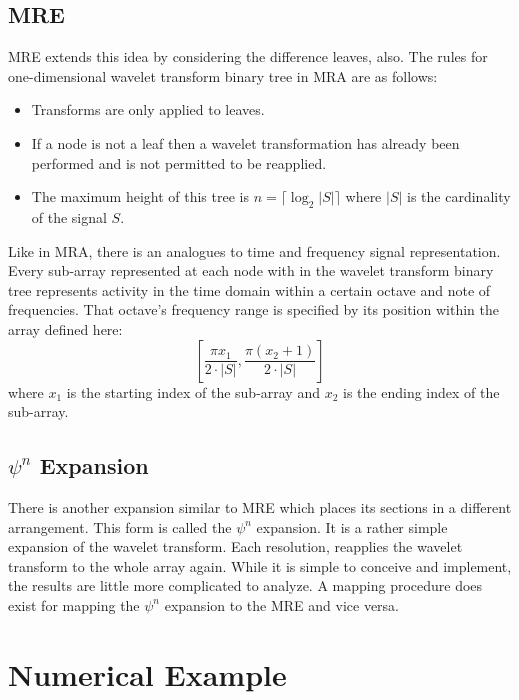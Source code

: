 \subsection{MRE}

MRE extends this idea by considering the difference leaves, also.  The rules for one-dimensional wavelet transform binary tree in MRA are as follows: 
\begin{itemize}
\item Transforms are only applied to leaves.
\item If a node is not a leaf then a wavelet transformation has already been performed and is not permitted to be reapplied.
\item The maximum height of this tree is $n = \lceil \log_2 \left|S\right| \rceil$ where $\left|S\right|$ is the cardinality of the signal $S$.
\end{itemize}   

Like in MRA, there is an analogues to time and frequency signal representation.  Every sub-array represented at each node with in the wavelet transform binary tree represents activity in the time domain within a certain octave and note of frequencies.  That octave's frequency range is specified by its position within the array defined here:
\[
\left[
\frac{\pi x_1}{2 \cdot \left|S\right|} , \frac{\pi (x_2+1)}{2 \cdot \left|S\right|} 
\right]
\]
where $x_1$ is the starting index of the sub-array and $x_2$ is the ending index of the sub-array.

\subsection{$\psi^n$ Expansion}

There is another expansion similar to MRE which places its sections in a different arrangement.  This form is called the $\psi^n$ expansion.  It is a rather simple expansion of the wavelet transform.  Each resolution, reapplies the wavelet transform to the whole array again.  While it is simple to conceive and implement, the results are little more complicated to analyze.  A mapping procedure does exist for mapping the $\psi^n$ expansion to the MRE and vice versa.  

\section {Numerical Example}

